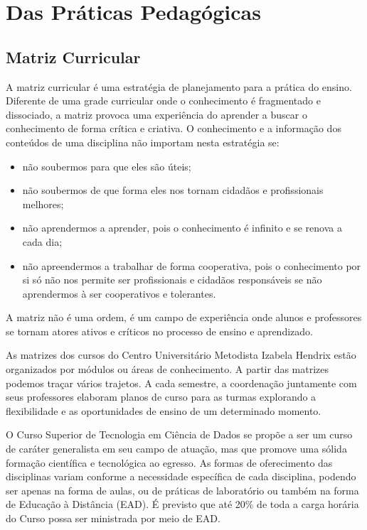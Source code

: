 \documentclass[a4paper, 12pt, openright, oneside, german, french, english, brazil]{abntex2}
\begin{document}
\part{Das Práticas Pedagógicas}

\chapter{Matriz Curricular}

A matriz curricular é uma estratégia de planejamento para a prática do ensino. Diferente de uma grade curricular onde o conhecimento é fragmentado e dissociado, a matriz provoca uma experiência do aprender a buscar o conhecimento de forma crítica e criativa. O conhecimento e a informação dos conteúdos de uma disciplina não importam nesta estratégia se:

\begin{itemize}
\item não soubermos para que eles são úteis;
\item não soubermos de que forma eles nos tornam cidadãos e profissionais melhores;
\item não aprendermos a aprender, pois o conhecimento é infinito e se renova a cada dia;
\item não apreendermos a trabalhar de forma cooperativa, pois o conhecimento por si só não nos permite ser profissionais e cidadãos responsáveis se não aprendermos à ser cooperativos e tolerantes.
\end{itemize}

A matriz não é uma ordem, é um campo de experiência onde alunos e professores se tornam atores ativos e críticos no processo de ensino e aprendizado.

As matrizes dos cursos do Centro Universitário Metodista Izabela Hendrix estão organizados por módulos ou áreas de conhecimento. A partir das matrizes podemos traçar vários trajetos. A cada semestre, a coordenação juntamente com seus professores elaboram planos de curso para as turmas explorando a flexibilidade e as oportunidades de ensino de um determinado momento.

O Curso Superior de Tecnologia em Ciência de Dados se propõe a ser um curso de caráter generalista em seu campo de atuação, mas que promove uma sólida formação científica e tecnológica ao egresso. As formas de oferecimento das disciplinas variam conforme a necessidade específica de cada disciplina, podendo ser apenas na forma de aulas, ou de práticas de laboratório ou também na forma de Educação à Distância (EAD). É previsto que até 20\% de toda a carga horária do Curso possa ser ministrada por meio de EAD.
\end{document}
